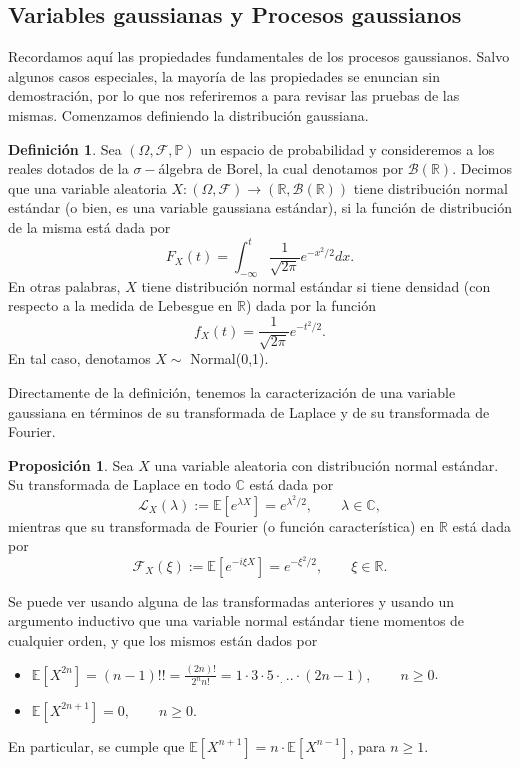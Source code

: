 \documentclass[letterpaper,twoside,12pt]{book}
\newcommand{\R}{\mathbb{R}}
\newcommand{\C}{\mathbb{C}}
\newcommand{\F}{\mathcal{F}}
\newcommand{\B}{\mathcal{B}}
\newcommand{\E}{\mathbb{E}}
\renewcommand{\P}{\mathbb{P}}
\newcommand{\1}{\mathds{1}}
\renewcommand{\to}{\rightarrow}
\theoremstyle{definition}
\newtheorem{dfn}{Definición}
\theoremstyle{definition}
\theoremstyle{remark}
\theoremstyle{definition}
\theoremstyle{definition}
\newtheorem{prop}{Proposición}
\theoremstyle{definition}
\theoremstyle{definition}
\theoremstyle{definition}
\begin{document}
\subsection{Variables gaussianas y Procesos gaussianos}
Recordamos aquí las propiedades fundamentales de los procesos gaussianos. Salvo algunos casos especiales, la mayoría de las propiedades se enuncian sin demostración, por lo que nos referiremos a \cite{gall2016brownian} para revisar las pruebas de las mismas. Comenzamos definiendo la distribución gaussiana.

\begin{dfn}
Sea $(\Omega, \F, \P)$ un espacio de probabilidad y consideremos a los reales dotados de la $\sigma-$álgebra de Borel, la cual denotamos por $\B(\R)$. Decimos que una variable aleatoria $X:(\Omega, \F)\to (\R,\B(\R))$ tiene distribución normal estándar (o bien, es una variable gaussiana estándar), si la función de distribución de la misma está dada por
\[
F_X(t)=\int_{-\infty}^{t}\frac{1}{\sqrt{2\pi}}e^{-x^2/2}dx.    
\]
En otras palabras, $X$ tiene distribución normal estándar si tiene densidad (con respecto a la medida de Lebesgue en $\R$) dada por la función 
\[
f_X(t)=\frac{1}{\sqrt{2\pi}}e^{-t^2/2}.
\]
En tal caso, denotamos $X\sim$ Normal(0,1).
\end{dfn}

Directamente de la definición, tenemos la caracterización de una variable gaussiana en términos de su transformada de Laplace y de su transformada de Fourier.
\begin{prop}\label{definiciongaussiana}
 Sea $X$ una variable aleatoria con distribución normal estándar. Su transformada de Laplace en todo $\C$ está dada por 
 \[
 \mathcal{L}_X(\lambda):=\E\left[e^{\lambda X}\right]=e^{\lambda^2/2}, \qquad \lambda\in \C,
 \]
mientras que su transformada de Fourier (o función característica) en $\R$ está dada por 
\[
\mathcal{F}_X(\xi):=\E\left[e^{-i\xi X}\right]=e^{-\xi^2/2}, \qquad \xi \in \R. 
\]
 \end{prop}
Se puede ver usando alguna de las transformadas anteriores y usando un argumento inductivo que una variable normal estándar tiene momentos de cualquier orden, y que los mismos están dados por 
 \begin{itemize}
   \item $\E\left[X^{2n}\right]=(n-1)!!=\frac{(2n)!}{2^nn!}=1\cdot3\cdot5\cdot_...\cdot (2n-1), \qquad n\geq0$.
   \item $\E\left[X^{2n+1}\right]=0, \qquad n\geq0$.
 \end{itemize}
 En particular, se cumple que $\E\left[X^{n+1}\right]=n\cdot \E\left[X^{n-1}\right]$, para $n\geq1$.
\end{document}
